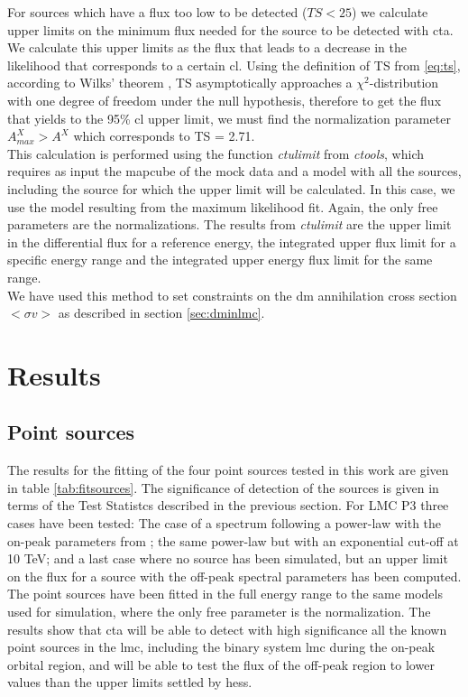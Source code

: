 \documentclass[main.tex]{subfiles}
\begin{document}
For sources which have a flux too low to be detected ($TS < 25$) we calculate upper limits on the minimum flux needed for the source to be detected with \gls{cta}. We calculate this upper limits as the flux that leads to a decrease in the likelihood that corresponds to a certain \gls{cl}. Using the definition of TS from \ref{eq:ts}, according to Wilks' theorem \cite{wilks1938}, TS asymptotically approaches a $\chi^2$-distribution with one degree of freedom under the null hypothesis, therefore to get the flux that yields to the 95\% \gls{cl} upper limit, we must find the normalization parameter $A^X_{max} > A^{X}$ which corresponds to TS = 2.71.\\
This calculation is performed using the function \textit{ctulimit} from \textit{ctools}, which requires as input the mapcube of the mock data and a model with all the sources, including the source for which the upper limit will be calculated. In this case, we use the model resulting from the maximum likelihood fit. Again, the only free parameters are the normalizations. The results from \textit{ctulimit} are the upper limit in the differential flux for a reference energy, the integrated upper flux limit for a specific energy range and the integrated upper energy flux limit for the same range.\\
We have used this method to set constraints on the \gls{dm} annihilation cross section $<\sigma v>$ as described in section \ref{sec:dminlmc}.

\section{Results}\label{sec:results}
        
\subsection{Point sources}

The results for the fitting of the four point sources tested in this work are given in table \ref{tab:fitsources}. The significance of detection of the sources is given in terms of the Test Statistcs described in the previous section. For LMC P3 three cases have been tested: The case of a spectrum following a power-law with the on-peak parameters from \cite{2017HESSLMCP3}; the same power-law but with an exponential cut-off at 10 TeV; and a last case where no source has been simulated, but an upper limit on the flux for a source with the off-peak spectral parameters has been computed.\\
The point sources have been fitted in the full energy range to the same models used for simulation, where the only free parameter is the normalization.
The results show that \gls{cta} will be able to detect with high significance all the known point sources in the \gls{lmc}, including the binary system \gls{lmc} during the on-peak orbital region, and will be able to test the flux of the off-peak region to lower values than the upper limits settled by \gls{hess}. 
\end{document}
